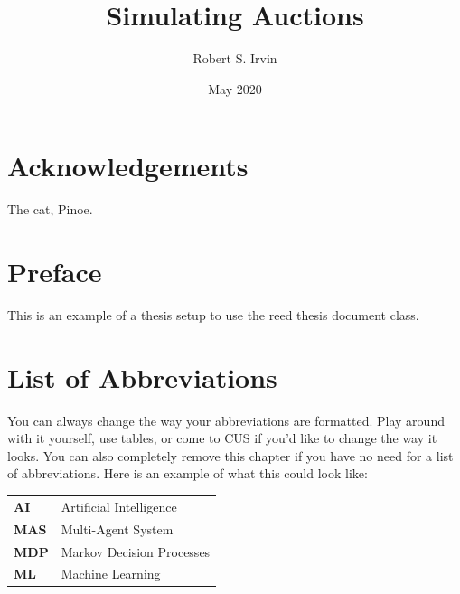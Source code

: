 \documentclass[12pt,twoside]{reedthesis}
\title{Simulating Auctions}
\author{Robert S. Irvin}
\date{May 2020}
\begin{document}
  \maketitle
  \frontmatter %
  \pagestyle{empty} %

    \chapter*{Acknowledgements}
	The cat, Pinoe.

    \chapter*{Preface}
	This is an example of a thesis setup to use the reed thesis document class.
	
	

    \chapter*{List of Abbreviations}
		You can always change the way your abbreviations are formatted. Play around with it yourself, use tables, or come to CUS if you'd like to change the way it looks. You can also completely remove this chapter if you have no need for a list of abbreviations. Here is an example of what this could look like:

	\begin{table}[h]
	\centering %
	\begin{tabular}{ll}
		\textbf{AI}  	&  Artificial Intelligence\\
		\textbf{MAS}  	&  Multi-Agent System\\
		\textbf{MDP}    &  Markov Decision Processes\\
		\textbf{ML}     &  Machine Learning\\
	\end{tabular}
	\end{table}
	

    \tableofcontents
    \listoftables
    \listoffigures

\end{document}
